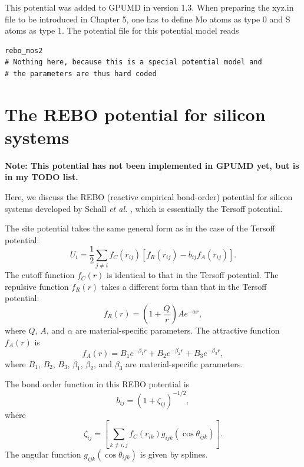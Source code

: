 \documentclass[12pt,a4paper]{report}
\begin{document}
This potential was added to GPUMD in version 1.3. When preparing the xyz.in file to be introduced in Chapter 5, one has to define Mo atoms as type 0 and S atoms as type 1. The potential file for this potential model reads
\begin{verbatim}
rebo_mos2
# Nothing here, because this is a special potential model and 
# the parameters are thus hard coded
\end{verbatim}



\section{The REBO potential for silicon systems}


\textbf{Note: This potential has not been implemented in GPUMD yet, but is in my TODO list.}

Here, we discuss the REBO (reactive empirical bond-order) potential for silicon systems developed by Schall \textit{et al.} \cite{schall2008prb},  which  is essentially the Tersoff potential. 


The site potential takes the same general form as in the case of the Tersoff potential:
\begin{equation}
U_i =  \frac{1}{2} \sum_{j \neq i} f_C(r_{ij}) \left[ f_R(r_{ij}) - b_{ij} f_A(r_{ij}) \right].
\end{equation}
The cutoff function $f_{C}(r)$ is identical to that in the Tersoff potential. The repulsive function $f_{R}(r)$ takes a different form than that in the Tersoff potential:
\begin{equation}
f_{R}(r) = \left(1+\frac{Q}{r}\right) A e^{-\alpha r},
\end{equation}
where $Q$, $A$, and $\alpha$ are material-specific parameters. The attractive function $f_{A}(r)$ is
\begin{equation}
f_{A}(r) = B_1 e^{-\beta_1 r} + B_2 e^{-\beta_2 r} + B_3 e^{-\beta_3 r},
\end{equation}
where $B_1$, $B_2$, $B_3$, $\beta_1$, $\beta_2$, and $\beta_3$ are material-specific parameters.

The bond order function in this REBO potential is
\begin{equation}
b_{ij} =\left(1 + \zeta_{ij}\right)^{-1/2},
\end{equation}
where
\begin{equation}
\zeta_{ij} = \left[ \sum_{k\neq i, j} f_C(r_{ik}) g_{ijk}(\cos\theta_{ijk}) \right].
\end{equation}
The angular function  $g_{ijk}(\cos\theta_{ijk})$ is given by splines.
\end{document}
